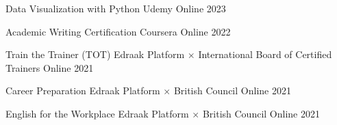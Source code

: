 \begin{cvhonors}

  \cvhonor
    {Data Visualization with Python}
    {Udemy}
    {Online}
    {2023}

  \cvhonor
    {Academic Writing Certification}
    {Coursera}
    {Online}
    {2022}

  \cvhonor
    {Train the Trainer (TOT)}
    {Edraak Platform $\times$ International Board of Certified Trainers}
    {Online}
    {2021}

  \cvhonor
    {Career Preparation}
    {Edraak Platform $\times$ British Council}
    {Online}
    {2021}

  \cvhonor
    {English for the Workplace}
    {Edraak Platform $\times$ British Council}
    {Online}
    {2021}

\end{cvhonors}

